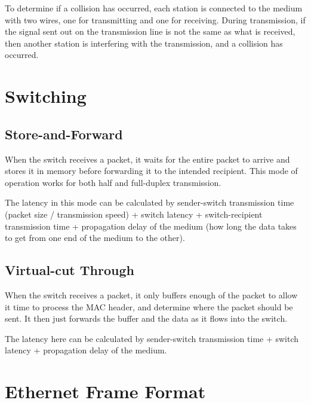 To determine if a collision has occurred, each station is connected to the medium with two wires, one for transmitting
 and one for receiving. During transmission, if the signal sent out on the transmission line is not the same as what is
 received, then another station is interfering with the transmission, and a collision has occurred.

\section*{Switching}

\subsection*{Store-and-Forward}

When the switch receives a packet, it waits for the entire packet to arrive and stores it in memory before forwarding it
 to the intended recipient. This mode of operation works for both half and full-duplex transmission.

The latency in this mode can be calculated by sender-switch transmission time (packet size / transmission speed) +
 switch latency + switch-recipient transmission time + propagation delay of the medium (how long the data takes to get
 from one end of the medium to the other).

\subsection*{Virtual-cut Through}

When the switch receives a packet, it only buffers enough of the packet to allow it time to process the MAC header, and
 determine where the packet should be sent. It then just forwards the buffer and the data as it flows into the switch.

The latency here can be calculated by sender-switch transmission time + switch latency + propagation delay of the
 medium.

\section*{Ethernet Frame Format}

